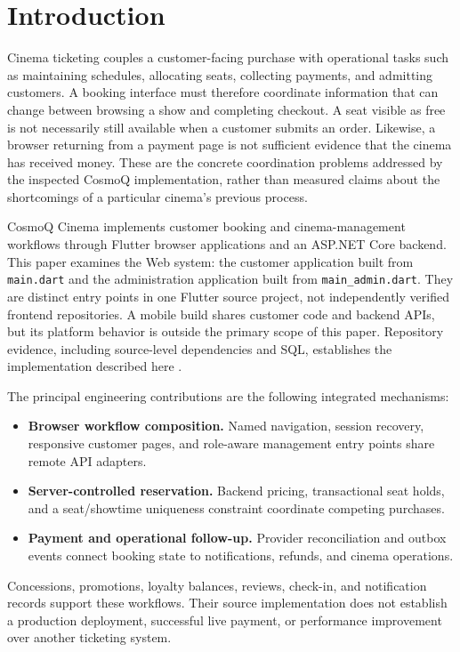 \documentclass[conference]{IEEEtran}
\newenvironment{keypoints}{\begin{itemize}\setlength{\itemsep}{2pt}%
\setlength{\parsep}{0pt}}{\end{itemize}}
\newcommand{\code}[1]{\texttt{#1}}
\begin{document}
\section{Introduction}
Cinema ticketing couples a customer-facing purchase with operational tasks such
as maintaining schedules, allocating seats, collecting payments, and admitting
customers. A booking interface must therefore coordinate information that can
change between browsing a show and completing checkout. A seat visible as free
is not necessarily still available when a customer submits an order. Likewise,
a browser returning from a payment page is not sufficient evidence that the
cinema has received money. These are the concrete coordination problems
addressed by the inspected CosmoQ implementation, rather than measured claims
about the shortcomings of a particular cinema's previous process.

CosmoQ Cinema implements customer booking and cinema-management workflows
through Flutter browser applications and an ASP.NET Core backend. This paper
examines the Web system: the customer application built from \code{main.dart}
and the administration application built from \code{main\_admin.dart}. They are
distinct entry points in one Flutter source project, not independently verified
frontend repositories. A mobile build shares customer code and backend APIs,
but its platform behavior is outside the primary scope of this paper.
Repository evidence, including source-level dependencies and SQL, establishes
the implementation described here \cite{client,webui,deployment,db}.

The principal engineering contributions are the following integrated mechanisms:
\begin{keypoints}
\item \textbf{Browser workflow composition.} Named navigation, session recovery,
responsive customer pages, and role-aware management entry points share remote API adapters.
\item \textbf{Server-controlled reservation.} Backend pricing, transactional seat
holds, and a seat/showtime uniqueness constraint coordinate competing purchases.
\item \textbf{Payment and operational follow-up.} Provider reconciliation and
outbox events connect booking state to notifications, refunds, and cinema operations.
\end{keypoints}
Concessions, promotions, loyalty balances, reviews, check-in, and notification
records support these workflows. Their source implementation does not establish
a production deployment, successful live payment, or performance improvement
over another ticketing system.
\end{document}
